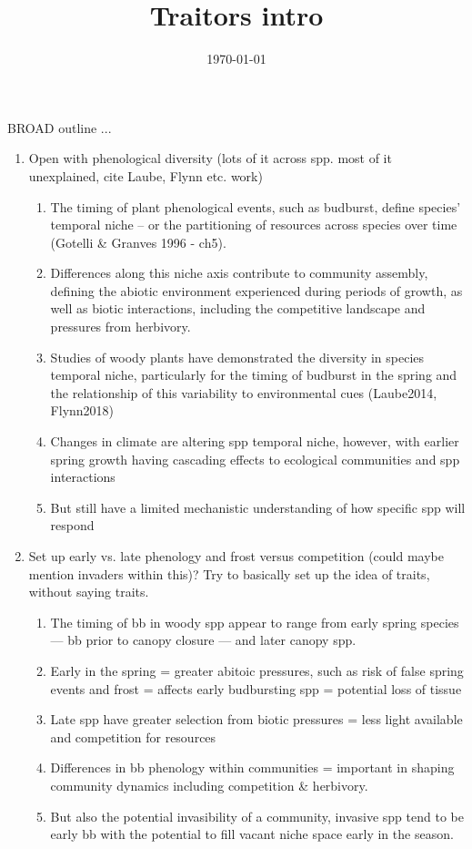 \documentclass{article}
\begin{document}
\title{Traitors intro}
\date{\today}

\maketitle 

BROAD outline ...

\begin{enumerate}

\item Open with phenological diversity (lots of it across spp. most of it unexplained, cite Laube, Flynn etc. work)

\begin{enumerate}
\item The timing of plant phenological events, such as budburst, define species' temporal niche -- or the partitioning of resources across species over time (Gotelli \& Granves 1996 - ch5).
\item Differences along this niche axis contribute to community assembly, defining the abiotic environment experienced during periods of growth, as well as biotic interactions, including the competitive landscape and pressures from herbivory.
\item Studies of woody plants have demonstrated the diversity in species temporal niche, particularly for the timing of budburst in the spring and the relationship of this variability to environmental cues (Laube2014, Flynn2018)
\item Changes in climate are altering spp temporal niche, however, with earlier spring growth having cascading effects to ecological communities and spp interactions
\item But still have a limited mechanistic understanding of how specific spp will respond
\end{enumerate}

\item Set up early vs. late phenology and frost versus competition (could maybe mention invaders within this)? Try to basically set up the idea of traits, without saying traits.
\begin{enumerate}
\item The timing of bb in woody spp appear to range from early spring species — bb prior to canopy closure — and later canopy spp. 
\item Early in the spring = greater abitoic pressures, such as risk of false spring events and frost = affects early budbursting spp = potential loss of tissue
\item Late spp have greater selection from biotic pressures = less light available and competition for resources 
\item Differences in bb phenology within communities = important in shaping community dynamics including competition \& herbivory. 
\item But also the potential invasibility of a community, invasive spp tend to be early bb with the potential to fill vacant niche space early in the season. 
\end{enumerate}


\end{enumerate}
\end{document}
